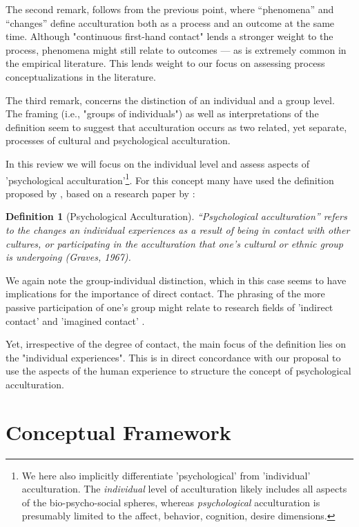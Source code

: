 \documentclass[nobib]{tufte-handout}
\newtheorem{definition}{Definition}
\begin{document}
The second remark, follows from the previous point, where “phenomena” and “changes” define acculturation both as a process and an outcome at the same time. Although "continuous first-hand contact" lends a stronger weight to the process, phenomena might still relate to outcomes --- as is extremely common in the empirical literature. This lends weight to our focus on assessing process conceptualizations in the literature.

The third remark, concerns the distinction of an individual and a group level. The framing (i.e., "groups of individuals") as well as interpretations of the definition \citep[e.g.,][]{Sam2006b, Berry2005} seem to suggest that acculturation occurs as two related, yet separate, processes of cultural and psychological acculturation. 

In this review we will focus on the individual level and assess aspects of 'psychological acculturation'\footnote{We here also implicitly differentiate 'psychological' from 'individual' acculturation. The \textit{individual} level of acculturation likely includes all aspects of the bio-psycho-social spheres, whereas \textit{psychological} acculturation is presumably limited to the affect, behavior, cognition, desire dimensions.}. For this concept many have used the definition proposed by \citet[][p. 14]{Sam2006b}, based on a research paper by \citet{Graves1967}: 
\begin{definition}[Psychological Acculturation]
“Psychological acculturation” refers to the changes an individual experiences as a result of being in contact with other cultures, or participating in the acculturation that one’s cultural or ethnic group is undergoing (Graves, 1967).
\end{definition}
We again note the group-individual distinction, which in this case seems to have implications for the importance of direct contact. The phrasing of the more passive participation of one's group might relate to research fields of 'indirect contact' \citep[e.g.,][]{Pettigrew2007} and 'imagined contact' \citep[e.g.,][]{Crisp2009}. 

Yet, irrespective of the degree of contact, the main focus of the definition lies on the "individual experiences". This is in direct concordance with our proposal to use the aspects of the human experience to structure the concept of psychological acculturation. 

\section{Conceptual Framework} 
\end{document}
